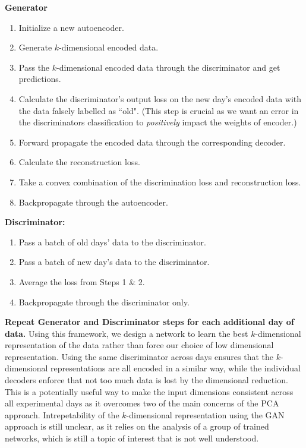 \documentclass[12pt]{article}
\begin{document}
\textbf{Generator}
\begin{enumerate}
  \item Initialize a new autoencoder.
  \item Generate $k$-dimensional encoded data.
  \item Pass the $k$-dimensional encoded data through the discriminator and get predictions.
  \item Calculate the discriminator's output loss on the new day's encoded data with the data falsely labelled as ``old". (This step is crucial as we want an error in the discriminators classification to \textit{positively} impact the weights of encoder.)
  \item Forward propagate the encoded data through the corresponding decoder.
  \item Calculate the reconstruction loss.
  \item Take a convex combination of the discrimination loss and reconstruction loss.
  \item Backpropagate through the autoencoder.
  \end{enumerate}
  \textbf{Discriminator:} \\
  \begin{enumerate}
    \item Pass a batch of old days' data to the discriminator.
    \item Pass a batch of new day's data to the discriminator.
    \item Average the loss from Steps 1 \& 2.
    \item Backpropagate through the discriminator only.
  \end{enumerate}
  \textbf{Repeat Generator and Discriminator steps for each additional day of data.}
\indent Using this framework, we design a network to learn the best $k$-dimensional representation of the data rather than force our choice of low dimensional representation. Using the same discriminator across days ensures that the $k$-dimensional representations are all encoded in a similar way, while the individual decoders enforce that not too much data is lost by the dimensional reduction. This is a potentially useful way to make the input dimensions consistent across all experimental days as it overcomes two of the main concerns of the PCA approach. Intrepetability of the $k$-dimensional representation using the GAN approach is still unclear, as it relies on the analysis of a group of trained networks, which is still a topic of interest that is not well understood. \\
\end{document}
